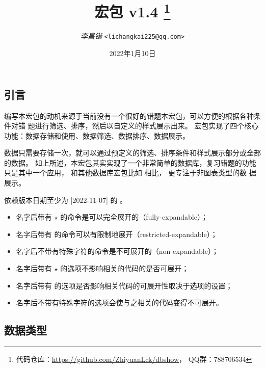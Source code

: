 \documentclass[full]{l3doc}
\def\zhdate{2022年1月10日}
\def\version{v1.4}
\begin{document}
\title{
   宏包 \version%
  \protect\footnote{%
    代码仓库：\url{https://github.com/ZhiyuanLck/dbshow}，
    QQ群：788706534}
}
\author{\textit{李昌锴} \texttt{<lichangkai225@qq.com>}}
\date{\zhdate}
\maketitle

\tableofcontents

\begin{documentation}

\section{引言}
编写本宏包的动机来源于当前没有一个很好的错题本宏包，可以方便的根据各种条件对错
题进行筛选、排序，然后以自定义的样式展示出来。 宏包实现了四个核心
功能：数据存储和使用、数据筛选、数据排序、数据展示。

数据只需要存储一次，就可以通过预定义的筛选、排序条件和样式展示部分或全部的数据。
如上所述，本宏包其实实现了一个非常简单的数据库，复习错题的功能只是其中一个应用，
和其他数据库宏包比如  相比， 更专注于非图表类型的数
据展示。

 依赖版本日期至少为 |2022-11-07| 的 。

\begin{itemize}
  \item 名字后带有 $\star$ 的命令是可以完全展开的（fully-expandable）；
  \item 名字后带有  的命令可以有限制地展开（restricted-expandable）；
  \item 名字后不带有特殊字符的命令是不可展开的（non-expandable）；
  \item 名字后带有 $\star$ 的选项不影响相关的代码的是否可展开；
  \item 名字后带有  的选项是否影响相关代码的可展开性取决于选项的设置；
  \item 名字后不带有特殊字符的选项会使与之相关的代码变得不可展开。
\end{itemize}

\subsection{数据类型}


\end{documentation}
\end{document}
